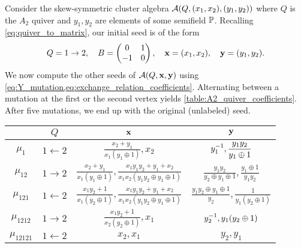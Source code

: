 \begin{example}

	Consider the skew-symmetric cluster algebra $\mathcal{A}(Q, (x_1, x_2), (y_1, y_2))$ where $Q$
	is the $A_2$ quiver and $y_1, y_2$ are elements of some semifield $\mathbb{P}$. Recalling
	\cref{eq:quiver_to_matrix}, our initial seed is of the form
	\begin{equation*}
		Q = 1 \to 2, \quad B = \begin{pmatrix}
			0  & 1 \\
			-1 & 0
		\end{pmatrix}, \quad \mathbf{x} = (x_1, x_2), \quad \mathbf{y} = (y_1, y_2).
	\end{equation*}
	We now compute the other seeds of $\mathcal{A}(Q, \mathbf{x}, \mathbf{y})$ using
	\cref{eq:Y_mutation,eq:exchange_relation_coefficients}. Alternating between a mutation
	at the first or the second vertex yields \cref{table:A2_quiver_coefficients}. After
	five mutations, we end up with the original (unlabeled) seed.
	\begin{table}[ht!]
		\centering
		\bgroup
		\renewcommand{\arraystretch}{2.5}
		\begin{tabular}{c|c|c|c}
			              & $\displaystyle Q$         & $\displaystyle \mathbf{x}$                                                                                                     & $\displaystyle \mathbf{y}$                                                                \\
			\hline
			$\mu_1$       & $\displaystyle 1 \gets 2$ & $\displaystyle \frac{x_2 + y_1}{x_1(y_1 \oplus 1)}, x_2$                                                                & $\displaystyle y_1^{-1}, \frac{y_1y_2}{y_1 \oplus 1}$                               \\[5pt]
			\hline
			$\mu_{12}$    & $\displaystyle 1 \to 2$   & $\displaystyle \frac{x_2 + y_1}{x_1(y_1 \oplus 1)}, \frac{x_1 y_1 y_2 + y_1 + x_2}{x_1x_2(y_1y_2\oplus y_1 \oplus 1)}$  & $\displaystyle \frac{y_1y_2}{y_2\oplus y_1\oplus 1}, \frac{y_1 \oplus 1}{y_1 y_2}$ \\[5pt]
			\hline
			$\mu_{121}$   & $\displaystyle 1 \gets 2$ & $\displaystyle \frac{x_1y_2 + 1}{x_1(y_2 \oplus 1)}, \frac{x_1 y_1 y_2 + y_1 + x_2}{x_1x_2(y_1y_2\oplus y_1 \oplus 1)}$ & $\displaystyle \frac{y_1y_2\oplus y_1\oplus 1}{y_2}, \frac{1}{y_1(y_2 \oplus 1)}$  \\[5pt]
			\hline
			$\mu_{1212}$  & $\displaystyle 1 \to 2$   & $\displaystyle \frac{x_1y_2 + 1}{x_2(y_2 \oplus 1)},x_1$                                                                & $\displaystyle y_2^{-1}, y_1(y_2 \oplus 1)$                                         \\[5pt]
			\hline
			$\mu_{12121}$ & $\displaystyle 1 \gets 2$ & $\displaystyle x_2,x_1$                                                                                                 & $\displaystyle y_2, y_1$
		\end{tabular}
		\egroup


\end{table}
\end{example}
